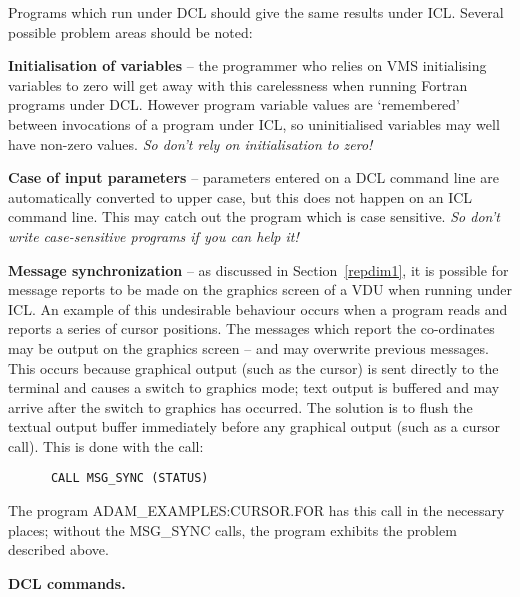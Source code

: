 Programs which run under DCL should give the same results under ICL.
Several possible problem areas should be noted:
\begin{description} 
\item{\bf Initialisation of variables} -- the programmer 
who relies on VMS initialising variables to zero will get away with this 
carelessness when running Fortran programs under DCL.
However program variable values are `remembered' between invocations
of a program under ICL, so uninitialised variables may well have 
non-zero values. {\sl So don't rely on initialisation to zero!}

\item{\bf Case of input parameters} -- parameters entered on a DCL
command line are automatically converted to upper case, but this does not
happen on an ICL command line. This may catch out the program which is
case sensitive. {\sl So don't write case-sensitive programs if you can help 
it!}

\item{\bf Message synchronization} -- as discussed in Section~\ref{repdim1},
it is possible for message reports to be 
made on the graphics screen of a VDU when running under ICL.
An example of this undesirable behaviour occurs when a program reads 
and reports a series of cursor positions.
The messages which report the co-ordinates may be output on the graphics 
screen -- and may overwrite previous messages. 
This occurs because graphical output (such as the cursor) is sent directly
to the terminal and causes a switch to graphics mode; text output is 
buffered and may arrive after the switch to graphics has occurred.
The solution is to flush  the textual output buffer immediately before any
graphical output (such as a cursor call).
This is done with the call:
\begin{verbatim}
      CALL MSG_SYNC (STATUS)
\end{verbatim}
The program ADAM\_EXAMPLES:CURSOR.FOR has this call in the necessary places;
without the MSG\_SYNC calls, the program exhibits the problem described 
above.
\end{description}

{\bigskip\large\bf DCL commands.}

